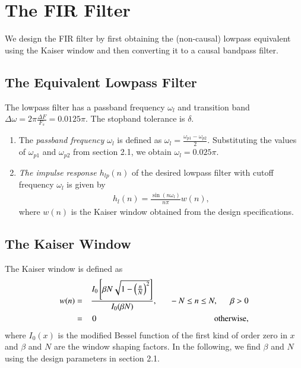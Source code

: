 \documentclass{article}
\begin{document}
\section{The FIR Filter}
We design the FIR filter by first obtaining the (non-causal) lowpass equivalent using the Kaiser window
and then
converting it to a causal bandpass filter.

\subsection{The Equivalent Lowpass Filter}
The lowpass filter has a passband frequency $\omega_l$ and transition band $\Delta \omega = 2\pi \frac{\Delta F}{F_s} = 0.0125\pi$.
The stopband tolerance is $\delta$.
\begin{enumerate}
\item  The {\em passband frequency $\omega_l$}  is defined as $\omega_l = \frac{\omega_{p1} - \omega_{p2}}{2}$.  Substituting the values of $\omega_{p1}$ and $\omega_{p2}$ from section 2.1, we obtain $\omega_l = 0.025\pi$.

\item {\em The impulse response $h_{lp}(n)$} of the desired lowpass filter with cutoff frequency $\omega_l$
is given by
\begin{eqnarray}
\label{firlpdef}
h_l(n) = \frac{\sin(n\omega_l)}{n\pi}w(n),
\end{eqnarray}
where $w(n)$ is the Kaiser window obtained from the design specifications.
\end{enumerate}
\subsection{The Kaiser Window}
The Kaiser window is defined as
\begin{eqnarray}
\label{kaiser}
w(n) &=& \frac{I_0\left[ \beta N \sqrt{1 - \left(\frac{n}{N}\right)^2} \right]}{I_0(\beta N)},
\indent -N \leq n \leq N, \indent \beta > 0 \nonumber \\
&=& 0 \hspace{5cm} \mbox{otherwise,}
\end{eqnarray}
where $I_0(x)$ is the modified Bessel function of the first kind of order zero in $x$ and $\beta$
and $N$ are the window shaping factors.  In the following,
we find $\beta$ and $N$ using the design parameters in section 2.1.
\end{document}
